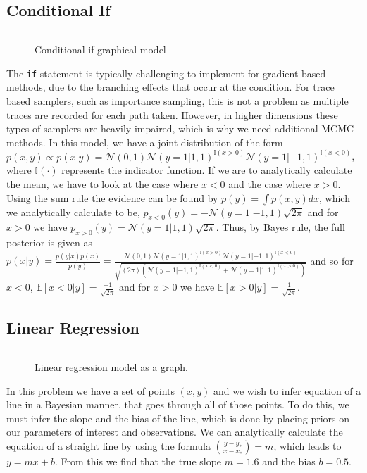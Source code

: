 \documentclass[twoside]{article}
\begin{document}
\subsection{Conditional If}
\inputminted{clojure}{code/conditionalif.clj}
\begin{figure}[ht]
	\begin{center}
		
	\end{center}
	\caption{Conditional if graphical model}
\end{figure}
The \texttt{if} statement is typically challenging to implement for gradient based methods, due to the branching effects that occur at the condition. For trace based samplers, such as importance sampling, this is not a problem as multiple traces are recorded for each path taken. However, in higher dimensions these types of samplers are heavily impaired, which is why we need additional MCMC methods. In this model, we have a joint distribution of the form $p(x,y) \propto p(x|y) = \mathcal{N}(0,1)\mathcal{N}(y = 1|1,1)^{\mathbb{I}(x > 0)}\mathcal{N}(y = 1|-1,1)^{\mathbb{I}(x < 0)}$, where $\mathbb{I}(\cdot)$ represents the indicator function. If we are to analytically calculate the mean, we have to look at the case where $x < 0$ and the case where $x>0$. Using the sum rule the evidence can be found by $p(y) = \int p(x,y) dx $, which we analytically calculate to be, $p_{x<0}(y) = -\mathcal{N}(y=1|-1,1)\sqrt{2\pi}$ and for $x>0$ we have  $p_{x>0}(y) = \mathcal{N}(y=1| 1,1)\sqrt{2\pi}$. Thus, by Bayes rule, the full posterior is given as $p(x | y) = \frac{p(y|x)p(x)}{p(y)} = \frac{\mathcal{N}(0,1)\mathcal{N}(y = 1|1,1)^{\mathbb{I}(x > 0)}\mathcal{N}(y = 1|-1,1)^{\mathbb{I}(x < 0)}}{\sqrt{(2\pi)(\mathcal{N}(y = 1|-1,1)^{\mathbb{I}(x < 0)} + \mathcal{N}(y = 1|1,1)^{\mathbb{I}(x > 0)} )}}$ and so for $x < 0$,  $\mathbb{E}[x < 0|y] = \frac{-1}{\sqrt{2\pi}} $ and for $x > 0$ we have $\mathbb{E}[x > 0|y] = \frac{1}{\sqrt{2\pi}}$. 
\subsection{Linear Regression}
\inputminted{clojure}{code/linearregression.clj}
\begin{figure}[ht]
	\begin{center}
		
	\end{center}
	\caption{Linear regression model as a graph.}
\end{figure}
In this problem we have a set of points $(x,y)$ and we wish to infer equation of a line in a Bayesian manner, that goes through all of those points. To do this, we must infer the slope and the bias of the line, which is done by placing priors on our parameters of interest and observations. We can analytically calculate the equation of a straight line by using the formula $\left(\frac{y - y_{*}}{x - x_{*}}\right) = m$, which leads to $y = mx + b$. From this we find that the true slope $m = 1.6$ and the bias $b = 0.5$.
\end{document}
